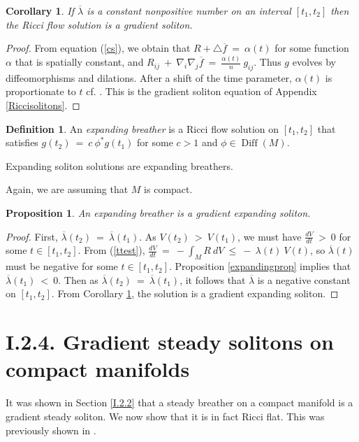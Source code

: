 \documentclass[12pt]{amsart}
\newcommand{\Diff}{\operatorname{Diff}}
\numberwithin{equation}{section}
\theoremstyle{plain}
\newtheorem{proposition}[equation]{Proposition}
\newtheorem{corollary}[equation]{Corollary}
\theoremstyle{definition}
\newtheorem{definition}[equation]{Definition}
\theoremstyle{remark}
\begin{document}
\begin{corollary} \label{expp}
If $\overline{\lambda}$ is a
constant nonpositive number on an interval $[t_1, t_2]$ then the
Ricci flow solution is a 
gradient soliton.
\end{corollary}
\begin{proof}
From equation (\ref{cs}), we obtain that $R + \triangle \overline{f} \: = \: \alpha(t)$ for some
function $\alpha$ that is spatially constant, and
$R_{ij} \: + \: \nabla_i \nabla_j \overline{f} \: = \: \frac{\alpha(t)}{n} \: g_{ij}$.
Thus $g$ evolves by diffeomorphisms and dilations.
After a shift of the time parameter,
$\alpha(t)$ is proportionate to $t$
cf. \cite[Lemma 2.4]{Chow-Knopf}. 
This is the gradient soliton equation of Appendix \ref{Riccisolitons}.
\end{proof}

\begin{definition}
An {\em expanding breather} is a Ricci flow solution on $[t_1, t_2]$ that
satisfies $g(t_2) \: = \: c \: \phi^* g(t_1)$ for some
$c > 1$ and $\phi \in \Diff(M)$. 
\end{definition}

Expanding soliton solutions are
expanding breathers.

Again, we are assuming that $M$ is
compact.

\begin{proposition}
An expanding breather is a gradient expanding soliton.
\end{proposition}
\begin{proof}
First, $\overline{\lambda}(t_2) \: = \: \overline{\lambda}(t_1)$.
As $V(t_2) \: > \: V(t_1)$, we must have
$\frac{dV}{dt} \: > \: 0$ for some $t \in [t_1, t_2]$.
From (\ref{ttest}), $\frac{dV}{dt} \: = \:
-  \int_M R \: dV \: \le \: - \: \lambda(t) \: V(t)$, so
$\overline{\lambda}(t)$ must be negative for some 
$t \in [t_1, t_2]$.
Proposition \ref{expandingprop} implies that
$\overline{\lambda}(t_1) \: < \: 0$. Then as
$\overline{\lambda}(t_2) \: = \: \overline{\lambda}(t_1)$, 
it follows that $\overline{\lambda}$ is a negative
constant on $[t_1, t_2]$. From Corollary \ref{expp}, the solution is a gradient expanding
soliton.
\end{proof}

\section{I.2.4. Gradient steady solitons on compact manifolds}

It was shown in Section \ref{I.2.2} that a steady breather on a compact manifold
is a gradient steady soliton.  We now show that it is in fact Ricci flat.
This was previously shown in \cite[Theorem 20.1]{Hamilton}.
\end{document}
